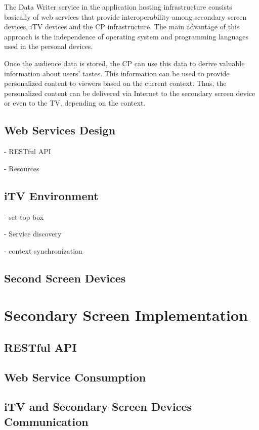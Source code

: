 \documentclass[journal]{IEEEtran}
\begin{document}
The Data Writer service in the application hosting infrastructure consists basically of web services that provide interoperability among secondary screen devices, iTV devices and the CP infrastructure. The main advantage of this approach is the independence of operating system and programming languages used in the personal devices.

Once the audience data is stored, the CP can use this data to derive valuable information about users' tastes. This information can be used to provide personalized content to viewers based on the current context. Thus, the personalized content can be delivered via Internet to the secondary screen device or even to the TV, depending on the context.

\subsection{Web Services Design}

- RESTful API

- Resources

\subsection{iTV Environment}

- set-top box

- Service discovery

- context synchronization

\subsection{Second Screen Devices}

\section{Secondary Screen Implementation}

\subsection{RESTful API}

\subsection{Web Service Consumption}

\subsection{iTV and Secondary Screen Devices Communication}
\end{document}
